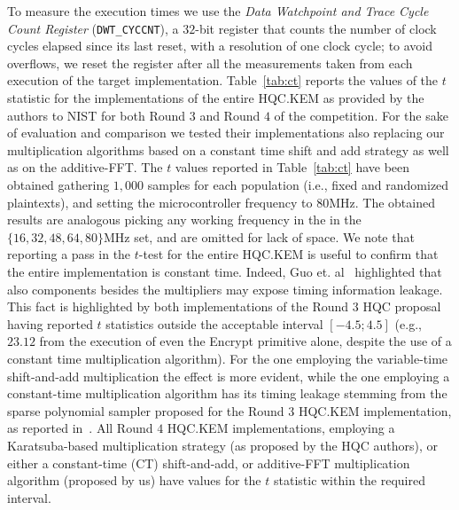 To measure the execution times we use the {\em Data Watchpoint and 
Trace Cycle Count Register} (\texttt{DWT\_CYCCNT}), a $32$-bit register that 
counts the number of clock cycles elapsed since its last reset, with a resolution
of one clock cycle; to avoid overflows, we reset the register after all the 
measurements taken from each execution of the target implementation.
Table~\ref{tab:ct} reports the values of the $t$ statistic for the implementations 
of the entire HQC.KEM as provided by the authors to NIST for both Round $3$ and Round $4$ of the competition. For the sake of evaluation and comparison we tested their implementations also replacing our multiplication algorithms based on a constant time shift and add strategy as well as on the additive-FFT. The $t$ values reported in Table~\ref{tab:ct} have been obtained gathering $1,000$ samples for each population (i.e., fixed and randomized plaintexts), and setting the microcontroller frequency to $80$MHz. 
The obtained results are analogous picking any working frequency in the
in the $\{16, 32, 48, 64, 80\}$MHz set, and are omitted for lack of space.
We note that reporting a pass in the $t$-test for the entire HQC.KEM is useful to confirm 
that the entire implementation is constant time. 
Indeed, Guo et. al~\cite{DBLP:journals/tches/GuoHJLNS22} highlighted that
also components besides the multipliers may expose timing information leakage.
This fact is highlighted by both implementations of the Round $3$ HQC proposal
having reported $t$ statistics outside the acceptable interval $[-4.5;4.5]$ (e.g., $23.12$ from the execution of even the {\sc Encrypt} primitive alone, despite the use of a constant time multiplication algorithm).
For the one employing the variable-time shift-and-add multiplication 
the effect is more evident, while the one employing a constant-time multiplication
algorithm has its timing leakage stemming from the sparse polynomial sampler proposed for the Round $3$ HQC.KEM 
implementation, as reported in~\cite{DBLP:journals/tches/GuoHJLNS22}. 
All Round $4$ HQC.KEM implementations, employing
a Karatsuba-based multiplication strategy (as proposed by the HQC authors), or either a constant-time (CT) shift-and-add, or additive-FFT multiplication algorithm (proposed by us) have values for the $t$ statistic within the required interval.


